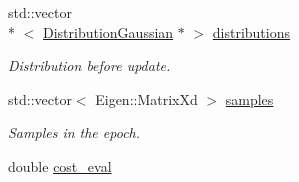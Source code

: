 \begin{DoxyCompactItemize}
\item 
std\+::vector\\*
$<$ \hyperlink{classDmpBbo_1_1DistributionGaussian}{Distribution\+Gaussian} $\ast$ $>$ \hyperlink{classDmpBbo_1_1UpdateSummaryParallel_a8a18736c693cebddd78ee177f1b98072}{distributions}
\begin{DoxyCompactList}\small\item\em Distribution before update. \end{DoxyCompactList}\item 
std\+::vector$<$ Eigen\+::\+Matrix\+Xd $>$ \hyperlink{classDmpBbo_1_1UpdateSummaryParallel_a51b1cef263f72426eb1462891d327338}{samples}
\begin{DoxyCompactList}\small\item\em Samples in the epoch. \end{DoxyCompactList}\item 
\hypertarget{classDmpBbo_1_1UpdateSummaryParallel_a1940a4e27a23d270fa5457eb65aada0f}{double \hyperlink{classDmpBbo_1_1UpdateSummaryParallel_a1940a4e27a23d270fa5457eb65aada0f}{cost\+\_\+eval}}\label{classDmpBbo_1_1UpdateSummaryParallel_a1940a4e27a23d270fa5457eb65aada0f}


\end{DoxyCompactItemize}
